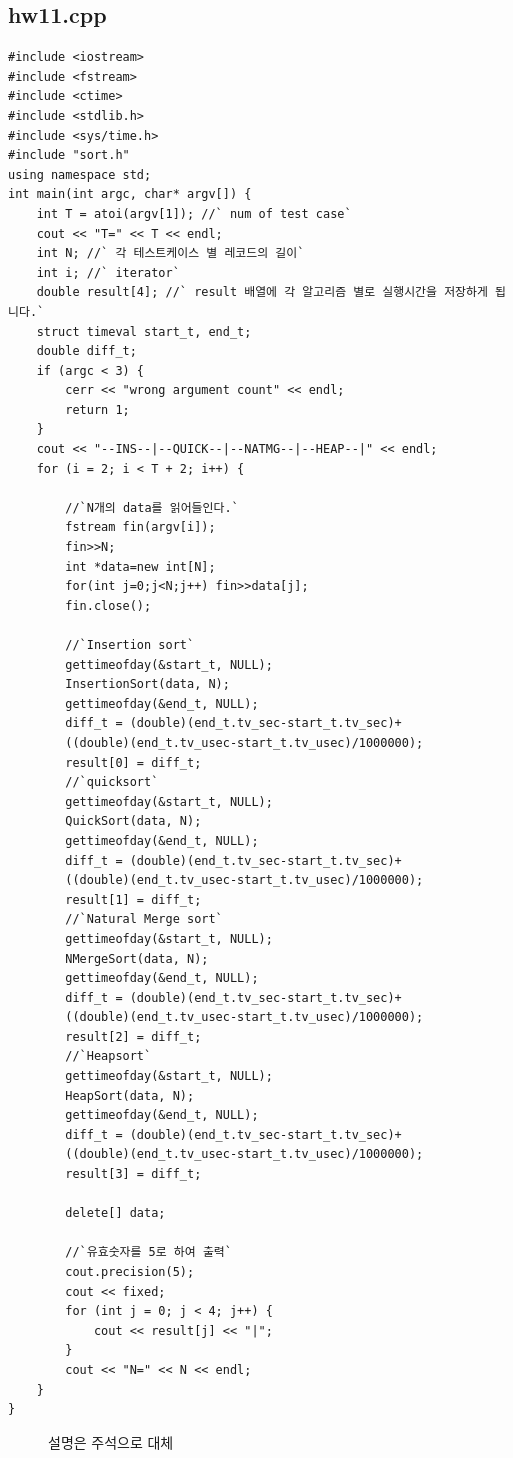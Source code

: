 \documentclass{article}
\begin{document}
\subsection{hw11.cpp}
\begin{lstlisting}
#include <iostream>
#include <fstream>
#include <ctime>
#include <stdlib.h>
#include <sys/time.h>
#include "sort.h"
using namespace std;
int main(int argc, char* argv[]) {
	int T = atoi(argv[1]); //` num of test case`
	cout << "T=" << T << endl;
	int N; //` 각 테스트케이스 별 레코드의 길이`
	int i; //` iterator`
	double result[4]; //` result 배열에 각 알고리즘 별로 실행시간을 저장하게 됩니다.`
	struct timeval start_t, end_t;
	double diff_t;
	if (argc < 3) {
		cerr << "wrong argument count" << endl;
		return 1;
	}
	cout << "--INS--|--QUICK--|--NATMG--|--HEAP--|" << endl;
	for (i = 2; i < T + 2; i++) {
		
		//`N개의 data를 읽어들인다.`
		fstream fin(argv[i]);
		fin>>N;
		int *data=new int[N];
		for(int j=0;j<N;j++) fin>>data[j];
		fin.close();
		
		//`Insertion sort`
		gettimeofday(&start_t, NULL);
		InsertionSort(data, N);
		gettimeofday(&end_t, NULL);
		diff_t = (double)(end_t.tv_sec-start_t.tv_sec)+
		((double)(end_t.tv_usec-start_t.tv_usec)/1000000);
		result[0] = diff_t;
		//`quicksort`
		gettimeofday(&start_t, NULL);
		QuickSort(data, N);
		gettimeofday(&end_t, NULL);
		diff_t = (double)(end_t.tv_sec-start_t.tv_sec)+
		((double)(end_t.tv_usec-start_t.tv_usec)/1000000);
		result[1] = diff_t;
		//`Natural Merge sort`
		gettimeofday(&start_t, NULL);
		NMergeSort(data, N);
		gettimeofday(&end_t, NULL);
		diff_t = (double)(end_t.tv_sec-start_t.tv_sec)+
		((double)(end_t.tv_usec-start_t.tv_usec)/1000000);
		result[2] = diff_t;
		//`Heapsort`
		gettimeofday(&start_t, NULL);
		HeapSort(data, N);
		gettimeofday(&end_t, NULL);
		diff_t = (double)(end_t.tv_sec-start_t.tv_sec)+
		((double)(end_t.tv_usec-start_t.tv_usec)/1000000);
		result[3] = diff_t;
		
		delete[] data;
		
		//`유효숫자를 5로 하여 출력`
		cout.precision(5);
		cout << fixed;
		for (int j = 0; j < 4; j++) {
			cout << result[j] << "|";
		}
		cout << "N=" << N << endl;
	}
}
\end{lstlisting}
\begin{figure}[H]
\caption*{설명은 주석으로 대체}
\end{figure}
\end{document}
